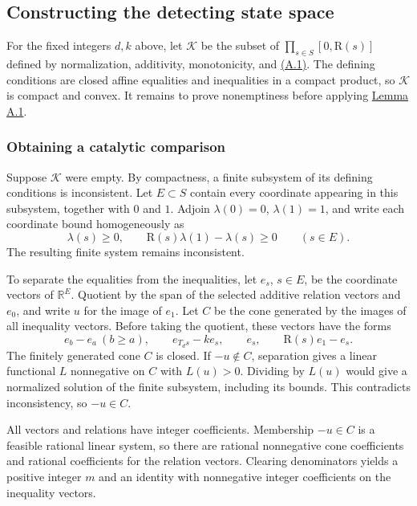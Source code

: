 \subsection{Constructing the detecting state space}\hypertarget{p107.sec.A.2}{}
\begin{amsthmproof}
For the fixed integers $d,k$ above, let $\mathcal K$ be the subset of $\prod_{s\in S}[0,\mathrm R(s)]$ defined by normalization, additivity, monotonicity, and \hyperlink{p107.eq.A.1}{(A.1)}. The defining conditions are closed affine equalities and inequalities in a compact product, so $\mathcal K$ is compact and convex. It remains to prove nonemptiness before applying \hyperlink{p107.result.A.1}{Lemma A.1}.

\subsubsection*{Obtaining a catalytic comparison}
Suppose $\mathcal K$ were empty. By compactness, a finite subsystem of its defining conditions is inconsistent. Let $E\subset S$ contain every coordinate appearing in this subsystem, together with $0$ and $1$. Adjoin $\lambda(0)=0$, $\lambda(1)=1$, and write each coordinate bound homogeneously as
\[
\lambda(s)\ge0,\qquad\mathrm R(s)\lambda(1)-\lambda(s)\ge0\qquad(s\in E).
\]
The resulting finite system remains inconsistent.

To separate the equalities from the inequalities, let $e_s$, $s\in E$, be the coordinate vectors of $\mathbb R^E$. Quotient by the span of the selected additive relation vectors and $e_0$, and write $u$ for the image of $e_1$. Let $C$ be the cone generated by the images of all inequality vectors. Before taking the quotient, these vectors have the forms
\[
e_b-e_a\ (b\ge a),\qquad e_{T_ds}-ke_s,\qquad e_s,\qquad\mathrm R(s)e_1-e_s.
\]
The finitely generated cone $C$ is closed. If $-u\notin C$, separation gives a linear functional $L$ nonnegative on $C$ with $L(u)>0$. Dividing by $L(u)$ would give a normalized solution of the finite subsystem, including its bounds. This contradicts inconsistency, so $-u\in C$.

All vectors and relations have integer coefficients. Membership $-u\in C$ is a feasible rational linear system, so there are rational nonnegative cone coefficients and rational coefficients for the relation vectors. Clearing denominators yields a positive integer $m$ and an identity with nonnegative integer coefficients on the inequality vectors.


\end{amsthmproof}
